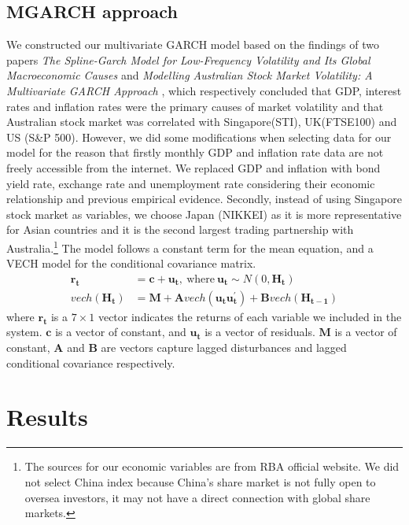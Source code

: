 \documentclass[11pt]{article}
\begin{document}
\subsection{MGARCH approach}
We constructed our multivariate GARCH model  based on the findings of two papers \emph{The Spline-Garch Model for Low-Frequency Volatility and Its Global Macroeconomic Causes} \citep{Spline} and \emph{Modelling Australian Stock Market Volatility: A Multivariate GARCH Approach} \citep{index}, which respectively concluded that GDP, interest rates and inflation rates were the primary causes of market volatility and that Australian stock market was correlated with Singapore(STI), UK(FTSE100) and US (S\&P 500). However, we did some modifications when selecting data for our model for the reason that firstly monthly GDP and inflation rate data are not freely accessible from the internet. We replaced GDP and inflation with bond yield rate, exchange rate and unemployment rate considering their economic relationship and previous empirical evidence. Secondly, instead of using Singapore stock market as variables, we choose Japan (NIKKEI) as it is more representative for Asian countries and it is the second largest trading partnership with Australia.\footnote{The sources for our economic variables are from RBA official website. We did not select China index because China's share market is not fully open to oversea investors, it may not have a direct connection with global share markets.} 
The model follows a constant term for the mean equation, and a VECH model for the conditional covariance matrix.
\begin{align}
\bm{r_{t}} &= \bm{c} + \bm{u_{t}}, \ \text{where} \	\bm{u_{t}} \sim N(0,\bm{H_t}) \\
vech(\bm{H_t}) &= \bm{M} + \bm{A} vech(\bm{u_t u_t^{'}}) + \bm{B} vech(\bm{H_{t-1}})
\end{align}
where $\bm{r_{t}}$ is a $7\times 1$ vector indicates the returns of each variable we included in the system. $\bm{c}$ is a vector of constant, and $\bm{u_t}$ is a vector of residuals. $\bm{M}$ is a vector of constant, $\bm{A}$ and $\bm{B}$ are vectors capture lagged disturbances and lagged conditional covariance respectively.

\section{Results}
\end{document}
